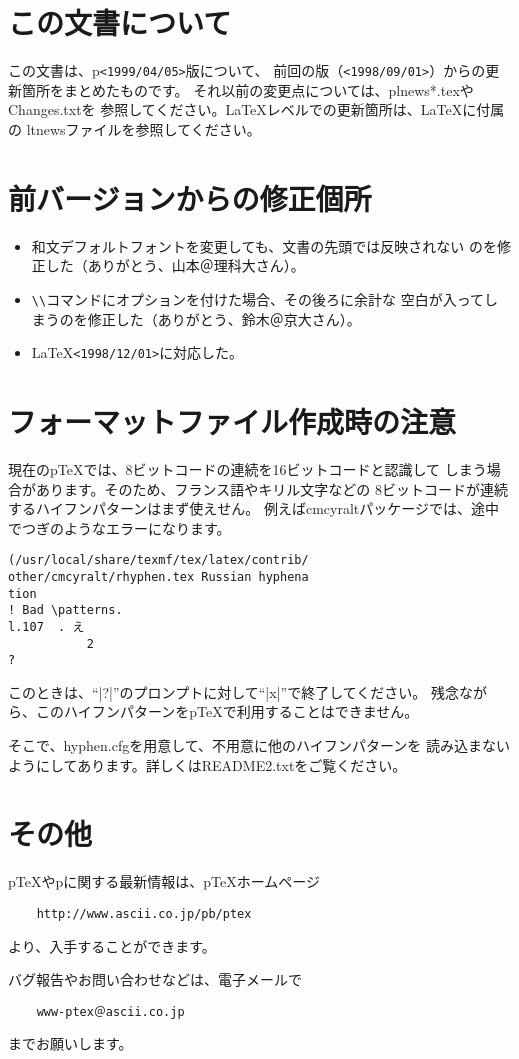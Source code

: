 \documentclass{plnews}
\author{中野 賢（\texttt{<ken-na at ascii.co.jp>}）
     \& 富樫 秀昭（\texttt{<hideak-t at ascii.co.jp>}）
}
\begin{document}
\maketitle

\section{この文書について}
この文書は、p\LaTeXe{}\texttt{<1999/04/05>}版について、
前回の版（\texttt{<1998/09/01>}）からの更新箇所をまとめたものです。
それ以前の変更点については、\textsf{plnews*.tex}やChanges.txtを
参照してください。\LaTeX{}レベルでの更新箇所は、\LaTeX{}に付属の
ltnewsファイルを参照してください。

\section{前バージョンからの修正個所}
\begin{itemize}
\item 和文デフォルトフォントを変更しても、文書の先頭では反映されない
  のを修正した（ありがとう、山本＠理科大さん）。
\item \verb|\\|コマンドにオプションを付けた場合、その後ろに余計な
  空白が入ってしまうのを修正した（ありがとう、鈴木＠京大さん）。
\item \LaTeX \texttt{<1998/12/01>}に対応した。
\end{itemize}


\section{フォーマットファイル作成時の注意}
現在のp\TeX{}では、8ビットコードの連続を16ビットコードと認識して
しまう場合があります。そのため、フランス語やキリル文字などの
8ビットコードが連続するハイフンパターンはまず使えせん。
例えばcmcyraltパッケージでは、途中でつぎのようなエラーになります。

\begin{verbatim}
(/usr/local/share/texmf/tex/latex/contrib/
other/cmcyralt/rhyphen.tex Russian hyphena
tion
! Bad \patterns.
l.107  . え
           2
?
\end{verbatim}

このときは、``|?|''のプロンプトに対して``|x|''で終了してください。
残念ながら、このハイフンパターンをp\TeX{}で利用することはできません。

そこで、hyphen.cfgを用意して、不用意に他のハイフンパターンを
読み込まないようにしてあります。詳しくはREADME2.txtをご覧ください。

\section{その他}
p\TeX{}やp\LaTeXe{}に関する最新情報は、p\TeX{}ホームページ
\begin{verbatim}
    http://www.ascii.co.jp/pb/ptex
\end{verbatim}
より、入手することができます。

バグ報告やお問い合わせなどは、電子メールで
\begin{verbatim}
    www-ptex＠ascii.co.jp
\end{verbatim}
までお願いします。
\end{document}
